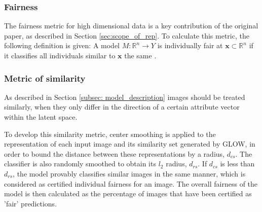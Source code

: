 \subsubsection{Fairness} The fairness metric for high dimensional data is a key contribution of the original paper, as described in Section \ref{sec:scope_of_rep}. To calculate this metric, the following definition is given: A model $\textit{M} : \mathbb{R}^n \to Y$ is individually fair at $\textbf{x} \subset \mathbb{R}^n $ if it classifies all individuals similar to $\textbf{x}$ the same \cite{ruoss2020learning}.


\subsubsection{Metric of similarity} As described in Section \ref{subsec: model_description} images should be treated similarly, when they only differ in the direction of a certain attribute vector within the latent space. \newline


To develop this similarity metric, center smoothing is applied to the representation of each input image and its similarity set generated by GLOW, in order to bound the distance between these representations by a radius, $d_{cs}$. The classifier is also randomly smoothed to obtain its $l_2$ radius, $d_{rs}$. If $d_{cs}$ is less than $d_{rs}$, the model provably classifies similar images in the same manner, which is considered as certified individual fairness for an image. The overall fairness of the model is then calculated as the percentage of images that have been certified as 'fair' predictions.


